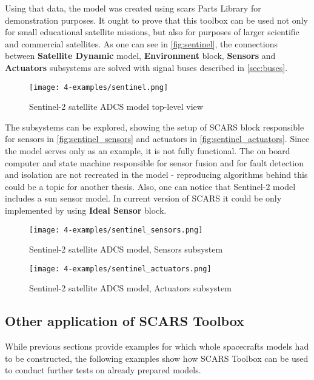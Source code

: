         Using that data, the model was created using \ac{scars} Parts Library for demonstration purposes. It ought to prove that this toolbox can be used not only for small educational satellite missions, but also for purposes of larger scientific and commercial satellites. As one can see in \autoref{fig:sentinel}, the connections between \textbf{Satellite Dynamic} model, \textbf{Environment} block, \textbf{Sensors} and \textbf{Actuators} subsystems are solved with signal buses described in \autoref{sec:buses}.
        
        \begin{sidewaysfigure}
            \centering
            \texttt{[image: 4-examples/sentinel.png]}
            \caption{Sentinel-2 satellite ADCS model top-level view}
            \label{fig:sentinel}
        \end{sidewaysfigure}

        The subsystems can be explored, showing the setup of SCARS block responsible for sensors in \autoref{fig:sentinel_sensors} and actuators in \autoref{fig:sentinel_actuators}. Since the model serves only as an example, it is not fully functional. The on board computer and state machine responsible for sensor fusion and for fault detection and isolation are not recreated in the model - reproducing algorithms behind this could be a topic for another thesis. Also, one can notice that Sentinel-2 model includes a sun sensor model. In current version of SCARS it could be only implemented by using \textbf{Ideal Sensor} block.
        
        \clearpage
        \begin{sidewaysfigure}
            \centering
            \texttt{[image: 4-examples/sentinel\_sensors.png]}
            \caption{Sentinel-2 satellite ADCS model, Sensors subsystem}
            \label{fig:sentinel_sensors}
        \end{sidewaysfigure}
        \clearpage
        \begin{sidewaysfigure}
            \centering
            \texttt{[image: 4-examples/sentinel\_actuators.png]}
            \caption{Sentinel-2 satellite ADCS model, Actuators subsystem}
            \label{fig:sentinel_actuators}
        \end{sidewaysfigure}
        \clearpage








\subsection{Other application of SCARS Toolbox}\label{sec:test_examples}
    While previous sections provide examples for which whole spacecrafts models had to be constructed, the following examples show how SCARS Toolbox can be used to conduct further tests on already prepared models. 


